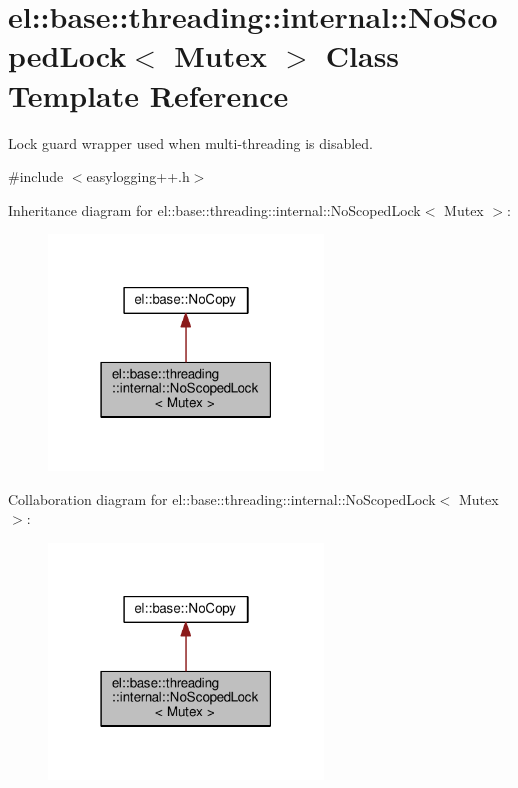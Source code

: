 \hypertarget{classel_1_1base_1_1threading_1_1internal_1_1_no_scoped_lock}{}\section{el\+:\+:base\+:\+:threading\+:\+:internal\+:\+:No\+Scoped\+Lock$<$ Mutex $>$ Class Template Reference}
\label{classel_1_1base_1_1threading_1_1internal_1_1_no_scoped_lock}


Lock guard wrapper used when multi-\/threading is disabled.  




{\ttfamily \#include $<$easylogging++.\+h$>$}



Inheritance diagram for el\+:\+:base\+:\+:threading\+:\+:internal\+:\+:No\+Scoped\+Lock$<$ Mutex $>$\+:
\nopagebreak
\begin{figure}[H]
\begin{center}
\leavevmode
\includegraphics[width=207pt]{classel_1_1base_1_1threading_1_1internal_1_1_no_scoped_lock__inherit__graph}
\end{center}
\end{figure}


Collaboration diagram for el\+:\+:base\+:\+:threading\+:\+:internal\+:\+:No\+Scoped\+Lock$<$ Mutex $>$\+:
\nopagebreak
\begin{figure}[H]
\begin{center}
\leavevmode
\includegraphics[width=207pt]{classel_1_1base_1_1threading_1_1internal_1_1_no_scoped_lock__coll__graph}
\end{center}
\end{figure}
